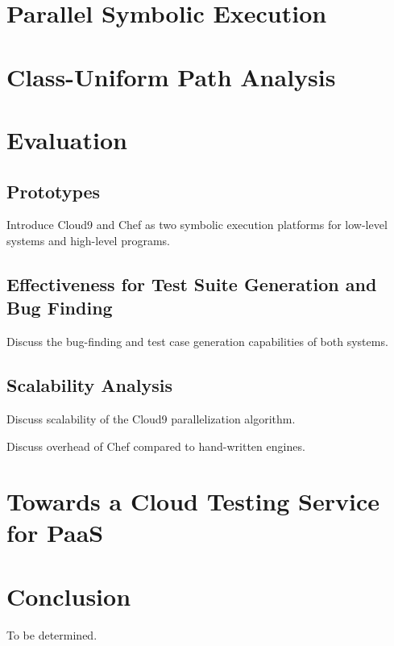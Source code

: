 \documentclass[letterpaper,12pt]{book}
\begin{document}
\chapter{Parallel Symbolic Execution}




\chapter{Class-Uniform Path Analysis}




\chapter{Evaluation}


\section{Prototypes}

Introduce Cloud9 and Chef as two symbolic execution platforms for low-level systems and high-level programs.

\section{Effectiveness for Test Suite Generation and Bug Finding}

Discuss the bug-finding and test case generation capabilities of both systems.

\section{Scalability Analysis}

Discuss scalability of the Cloud9 parallelization algorithm.

Discuss overhead of Chef compared to hand-written engines.


\chapter{Towards a Cloud Testing Service for PaaS}




\chapter{Conclusion}

To be determined.



\end{document}

